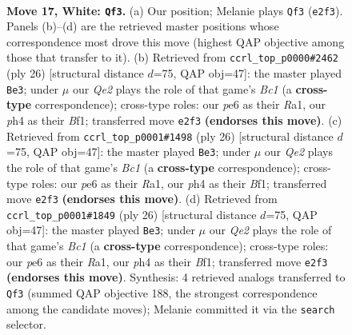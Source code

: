 \documentclass[11pt]{article}
\begin{document}
\begin{figure}[p]\centering
\begin{subfigure}{0.46\textwidth}\centering
\resizebox{\linewidth}{!}{%
\newchessgame
\chessboard[
  setfen={r1b1k2r/4bp2/4pn2/p2p2p1/3q3p/7P/PP2QPP1/RNB1KB1R w Qkq - 0 17},
  showmover=false,
  pgfstyle=straightmove, color=movearrow, markmove={e2-f3}
]}
\caption{}
\end{subfigure}\hfill
\begin{subfigure}{0.46\textwidth}\centering
\resizebox{\linewidth}{!}{%
\newchessgame
\chessboard[
  setfen={r3k1r1/pp1bnp2/n3p3/q2pP3/3N1P2/P1pQ4/2P3PP/R1B1KB1R w KQq - 5 14},
  showmover=false,
  pgfstyle=straightmove, color=movearrow, markmove={c1-e3}
]}
\caption{}
\end{subfigure}
\\[4pt]
\begin{subfigure}{0.46\textwidth}\centering
\resizebox{\linewidth}{!}{%
\newchessgame
\chessboard[
  setfen={r3k1r1/pp1bnp2/n3p3/q2pP3/3N1P2/P1pQ4/2P3PP/R1B1KB1R w KQq - 5 14},
  showmover=false,
  pgfstyle=straightmove, color=movearrow, markmove={c1-e3}
]}
\caption{}
\end{subfigure}\hfill
\begin{subfigure}{0.46\textwidth}\centering
\resizebox{\linewidth}{!}{%
\newchessgame
\chessboard[
  setfen={r3k1r1/pp1bnp2/n3p3/q2pP3/3N1P2/P1pQ4/2P3PP/R1B1KB1R w KQq - 5 14},
  showmover=false,
  pgfstyle=straightmove, color=movearrow, markmove={c1-e3}
]}
\caption{}
\end{subfigure}
\caption{\textbf{Move 17, White: \texttt{Qf3}.} (a) Our position; Melanie plays \texttt{Qf3} (\texttt{e2f3}). Panels (b)--(d) are the retrieved master positions whose correspondence most drove this move (highest QAP objective among those that transfer to it). (b) Retrieved from \texttt{ccrl\_top\_p0000\#2462} (ply 26) [structural distance $d$=75, QAP obj=47]: the master played \texttt{Be3}; under $\mu$ our \emph{Qe2} plays the role of that game's \emph{Bc1} (a \textbf{cross-type} correspondence); cross-type roles: our \emph{p}e6 as their \emph{R}a1, our \emph{p}h4 as their \emph{B}f1; transferred move \texttt{e2f3} \textbf{(endorses this move)}. (c) Retrieved from \texttt{ccrl\_top\_p0001\#1498} (ply 26) [structural distance $d$=75, QAP obj=47]: the master played \texttt{Be3}; under $\mu$ our \emph{Qe2} plays the role of that game's \emph{Bc1} (a \textbf{cross-type} correspondence); cross-type roles: our \emph{p}e6 as their \emph{R}a1, our \emph{p}h4 as their \emph{B}f1; transferred move \texttt{e2f3} \textbf{(endorses this move)}. (d) Retrieved from \texttt{ccrl\_top\_p0001\#1849} (ply 26) [structural distance $d$=75, QAP obj=47]: the master played \texttt{Be3}; under $\mu$ our \emph{Qe2} plays the role of that game's \emph{Bc1} (a \textbf{cross-type} correspondence); cross-type roles: our \emph{p}e6 as their \emph{R}a1, our \emph{p}h4 as their \emph{B}f1; transferred move \texttt{e2f3} \textbf{(endorses this move)}. Synthesis: 4 retrieved analogs transferred to \texttt{Qf3} (summed QAP objective 188, the strongest correspondence among the candidate moves); Melanie committed it via the \texttt{search} selector.}
\label{fig:thought-m32}
\end{figure}
\end{document}
